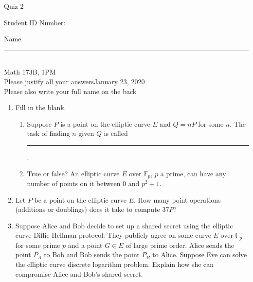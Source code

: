\documentclass[12pt]{article}
\newcommand{\field}{\mathbb{F}}
\begin{document}
\begin{flushleft} 
\centerline{\LARGE{Quiz 2}} 
\vspace{5 mm}
{Student ID Number:}\hfill  
{Name \rule {2 in}{0.01in}}\\
Math 173B, 1PM
\\
{Please justify all your answers}\hfill {January 23, 2020}
\\
{Please also write your full name on the back} 

\medskip
\end{flushleft}

\begin{enumerate}
	\item Fill in the blank.
	\begin{enumerate}
		\item Suppose $P$ is a point on the elliptic curve $E$ and $Q = nP$ for some $n$. The task of finding $n$ given $Q$ is called \rule{4cm}{.15mm}.
		\item True or false? An elliptic curve $E$ over $\field_p$, $p$ a prime, can have any number of points on it between 0 and $p^2+1$.
	\end{enumerate}

	\item Let $P$ be a point on the elliptic curve $E$. How many point operations (additions or doublings) does it take to compute $37P$?
	\vfill

	\item Suppose Alice and Bob decide to set up a shared secret using the elliptic curve Diffie-Hellman protocol. They publicly agree on some curve $E$ over $\field_p$ for some prime $p$ and a point $G\in E$ of large prime order. Alice sends the point $P_A$ to Bob and Bob sends the point $P_B$ to Alice. Suppose Eve can solve the elliptic curve discrete logarithm problem. Explain how she can compromise Alice and Bob's shared secret.
	\vfill
\end{enumerate}

\end{document}
